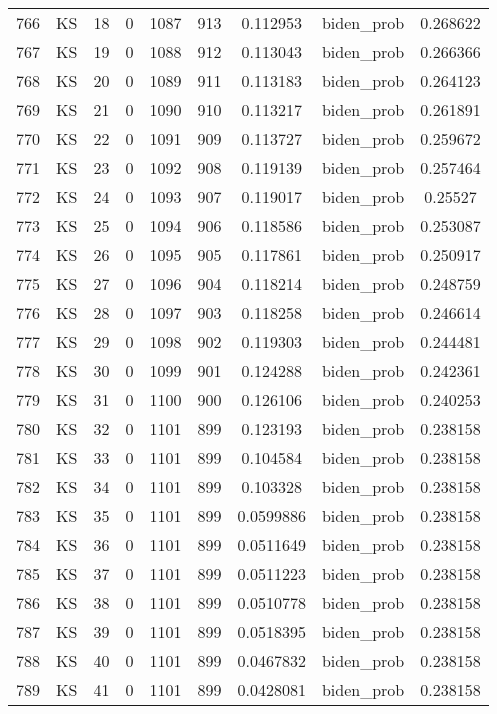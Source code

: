 \documentclass[12pt,a4paper]{article}
\begin{document}
\begin{tabular}{r|cccccccc}
	766 & KS & 18 & 0 & 1087 & 913 & 0.112953 & biden\_prob & 0.268622 \\
	767 & KS & 19 & 0 & 1088 & 912 & 0.113043 & biden\_prob & 0.266366 \\
	768 & KS & 20 & 0 & 1089 & 911 & 0.113183 & biden\_prob & 0.264123 \\
	769 & KS & 21 & 0 & 1090 & 910 & 0.113217 & biden\_prob & 0.261891 \\
	770 & KS & 22 & 0 & 1091 & 909 & 0.113727 & biden\_prob & 0.259672 \\
	771 & KS & 23 & 0 & 1092 & 908 & 0.119139 & biden\_prob & 0.257464 \\
	772 & KS & 24 & 0 & 1093 & 907 & 0.119017 & biden\_prob & 0.25527 \\
	773 & KS & 25 & 0 & 1094 & 906 & 0.118586 & biden\_prob & 0.253087 \\
	774 & KS & 26 & 0 & 1095 & 905 & 0.117861 & biden\_prob & 0.250917 \\
	775 & KS & 27 & 0 & 1096 & 904 & 0.118214 & biden\_prob & 0.248759 \\
	776 & KS & 28 & 0 & 1097 & 903 & 0.118258 & biden\_prob & 0.246614 \\
	777 & KS & 29 & 0 & 1098 & 902 & 0.119303 & biden\_prob & 0.244481 \\
	778 & KS & 30 & 0 & 1099 & 901 & 0.124288 & biden\_prob & 0.242361 \\
	779 & KS & 31 & 0 & 1100 & 900 & 0.126106 & biden\_prob & 0.240253 \\
	780 & KS & 32 & 0 & 1101 & 899 & 0.123193 & biden\_prob & 0.238158 \\
	781 & KS & 33 & 0 & 1101 & 899 & 0.104584 & biden\_prob & 0.238158 \\
	782 & KS & 34 & 0 & 1101 & 899 & 0.103328 & biden\_prob & 0.238158 \\
	783 & KS & 35 & 0 & 1101 & 899 & 0.0599886 & biden\_prob & 0.238158 \\
	784 & KS & 36 & 0 & 1101 & 899 & 0.0511649 & biden\_prob & 0.238158 \\
	785 & KS & 37 & 0 & 1101 & 899 & 0.0511223 & biden\_prob & 0.238158 \\
	786 & KS & 38 & 0 & 1101 & 899 & 0.0510778 & biden\_prob & 0.238158 \\
	787 & KS & 39 & 0 & 1101 & 899 & 0.0518395 & biden\_prob & 0.238158 \\
	788 & KS & 40 & 0 & 1101 & 899 & 0.0467832 & biden\_prob & 0.238158 \\
	789 & KS & 41 & 0 & 1101 & 899 & 0.0428081 & biden\_prob & 0.238158 \\

\end{tabular}
\end{document}
